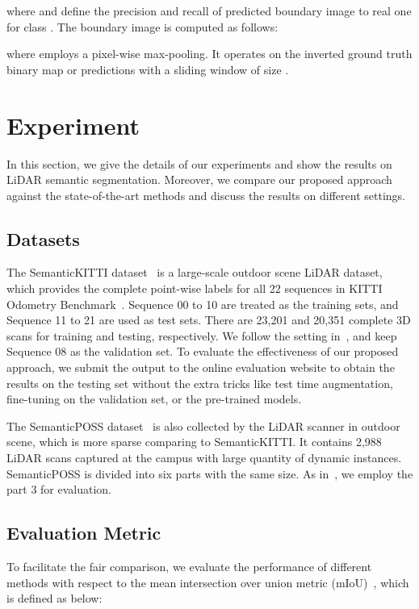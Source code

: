 \documentclass[letterpaper, 10 pt, journal, twoside]{ieeetran}
\begin{document}
where  and  define the precision and recall of predicted boundary image  to real one  for class . The boundary image is computed as follows:

where  employs a pixel-wise max-pooling. It operates on the inverted ground truth binary map or predictions with a sliding window of size .



\section{Experiment}
\label{sec:exp}
In this section, we give the details of our experiments and show the results on LiDAR semantic segmentation. Moreover, we compare our proposed approach against the state-of-the-art methods and discuss the results on different settings. 
\subsection{Datasets}
The SemanticKITTI dataset~\cite{behley2019semantickitti} is a large-scale outdoor scene LiDAR dataset, which provides the complete point-wise labels for all 22 sequences in KITTI Odometry Benchmark~\cite{geiger2013vision}. Sequence 00 to 10 are treated as the training sets, and Sequence 11 to 21 are used as test sets. There are 23,201 and 20,351 complete 3D scans for training and testing, respectively. We follow the setting in~\cite{behley2019semantickitti}, and keep Sequence 08 as the validation set. To evaluate the effectiveness of our proposed approach, we submit the output to the online evaluation website to obtain the results on the testing set without the extra tricks like test time augmentation, fine-tuning on the validation set, or the pre-trained models.

The SemanticPOSS dataset~\cite{pan2020semanticposs} is also collected by the LiDAR scanner in outdoor scene, which is more sparse comparing to SemanticKITTI. It contains 2,988 LiDAR scans captured at the campus with large quantity of dynamic instances. SemanticPOSS is divided into six parts with the same size. As in~\cite{pan2020semanticposs}, we employ the part 3 for evaluation.



\subsection{Evaluation Metric}
\label{sec:eva}
To facilitate the fair comparison, we evaluate the performance of different methods with respect to the mean intersection over union metric (mIoU)~\cite{behley2019semantickitti}, which is defined as below: 
\end{document}
